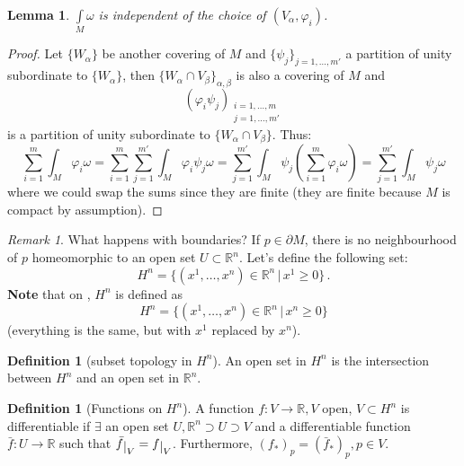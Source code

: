 \documentclass[a4paper,11pt,titlepage, article, oneside]{memoir}
\numberwithin{equation}{section}
\newtheorem{lemma}[theorem]{Lemma}
\theoremstyle{definition}
\newtheorem{definition}[theorem]{Definition}
\theoremstyle{remark}
\newtheorem{remark}[theorem]{Remark}
\newcommand{\rfield}{\mathbb{R}}
\newcommand{\restrict}[2]{{#1}\raisebox{-.5ex}{$|$}_{#2}}
\begin{document}
\begin{lemma}
  $\int\limits_{M} \omega$ is independent of the choice of $(V_{\alpha}, \varphi_i)$.
\end{lemma}
\begin{proof}
Let $\{ W_{\alpha} \}$ be another covering of $M$ and $\{\psi_j\}_{j=1, \ldots, m'}$ a partition of unity
 subordinate to $\{W_{\alpha}\}$,
 then $\{W_{\alpha} \cap V_{\beta}\}_{\alpha, \beta}$ is also
  a covering of $M$ and
  \[ \left(\varphi_i \psi_j \right)_{\substack{i=1, \ldots, m \\ j=1, \ldots, m'}}\]
  is a partition of unity subordinate to $\{W_{\alpha} \cap V_{\beta}\}$. Thus:
\[ \sum\limits_{i=1}^m \int_M \varphi_i \omega = \sum\limits_{i=1}^m \sum_{j=1}^{m'} \int_M \varphi_i \psi_j \omega = \sum\limits_{j=1}^{m'} \int_M \psi_j \left( \sum\limits_{i=1}^{m} \varphi_i \omega \right) = \sum\limits_{j=1}^{m'} \int_M \psi_j \omega \]
where we could swap the sums since they are finite (they are finite because $M$ is compact by assumption).
\end{proof}

\begin{remarkbox}\begin{remark}
  What happens with boundaries? If $p \in \partial M$, there is no neighbourhood of $p$ homeomorphic to an open set $U \subset \rfield^n$.
  Let's define the following set:
  $$H^n = \{ (x^1, \ldots, x^n) \in \rfield^n \, | \, x^1 \ge 0 \} \, .$$
  \textbf{Note} that on , $H^n$ is defined as
  $$H^n = \{ (x^1, \ldots, x^n) \in \rfield^n \, | \, x^n \ge 0 \}$$
  (everything is the same, but with $x^1$ replaced by $x^n$).
\end{remark}\end{remarkbox}

\begin{definition}[subset topology in $H^n$]
  An open set in $H^n$ is the intersection between $H^n$ and an open set in $\rfield^n$.
\end{definition}

\begin{definition}[Functions on $H^n$]
  A function $f \colon V \rightarrow \rfield, V$ open, $V \subset H^n$ is differentiable if $\exists$ an open set $U, \rfield^n \supset U \supset V$ and a differentiable function
  $\bar f \colon U \rightarrow \rfield$ such that $\restrict{\bar f}{V} = \restrict{f}{V}$.
  Furthermore, $(f_*)_p = (\bar f_*)_p, p \in V$.
\end{definition}
\end{document}
